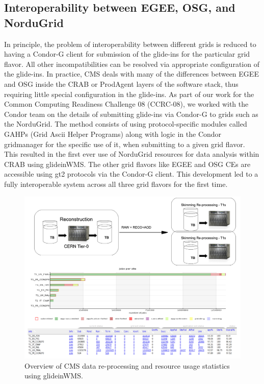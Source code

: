 \documentclass[a4paper]{jpconf}
\begin{document}
\subsection {Interoperability between EGEE, OSG, and NorduGrid}
In principle, the problem of interoperability between different grids is reduced to having a Condor-G client
for submission of the glide-ins for the particular grid flavor. All other incompatibilities can be 
resolved via appropriate configuration of the glide-ins. In practice, CMS deals with many of the differences 
between EGEE and OSG inside the CRAB or ProdAgent layers of the software stack, thus requiring little special 
configuration in the glide-ins. As part of our work for the Common Computing Readiness Challenge 08 (CCRC-08), we worked 
with the Condor team on the details of submitting glide-ins via Condor-G to grids such as the NorduGrid. The method 
consists of using protocol-specific modules called GAHPs (Grid Ascii Helper Programs) along with logic in the Condor gridmanager for the 
specific use of it, when submitting to a given grid flavor. This resulted 
in the first ever use of NorduGrid resources for data analysis within CRAB using glideinWMS. The other grid flavors like 
EGEE and OSG CEs are accessible using gt2 protocols via the Condor-G client. This development led to
a fully interoperable system across all three grid flavors for the first time.
\begin{figure}
\begin{center}
\includegraphics[scale=0.5]{DataReprocess}
\end{center}
\caption{Overview of CMS data re-processing and resource usage statistics using glideinWMS.}
\label{fig:reprocessT1s}
\end{figure}
\end{document}
